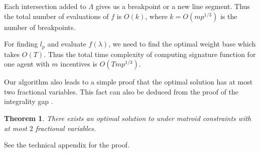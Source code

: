\documentclass{article}
\newcommand{\lps}{\tau}
\newtheorem{theorem}{Theorem}
\begin{document}
Each intersection added to $\Lambda$ gives us a breakpoint or a new line segment. Thus the total number of evaluations of $f$ is $O(k)$, where $k=O(mp^{1/3})$ is the number of breakpoints.

For finding $l_p$ and evaluate $f(\lambda)$, we need to find the optimal weight base which takes $O(T)$. Thus the total time complexity of computing signature function for one agent with $m$ incentives is $O(Tm p^{1/3})$.




Our algorithm also leads to a simple proof that the optimal solution has at most two fractional variables. This fact can also be deduced from the proof of the integrality gap \cite{CAMERINI1984157}.
\begin{theorem}\label{thm:2frac}
There exists an optimal solution to  under matroid constraints with at most $2$ fractional variables.
\end{theorem}

See the technical appendix for the proof.
\end{document}
